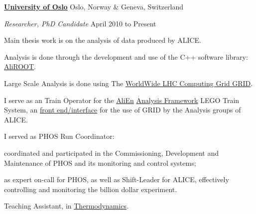 \documentclass[11pt]{article}
\newenvironment{outerlist}[1][\enskip\textbullet]%
        {\begin{itemize}[#1]}{\end{itemize}%
         \vspace{-.6\baselineskip}}
\newenvironment{innerlist}[1][\enskip\textbullet]%
        {\begin{compactitem}[#1]}{\end{compactitem}}
\newcommand{\blankline}{\quad\pagebreak[2]}
\begin{document}
\href{http://www.uib.no/en}{\textbf{University of Oslo}}
Oslo, Norway \& Geneva, Switzerland
\begin{outerlist}
\item[] \textit{Researcher, PhD Candidate}
  \hfill April 2010 to Present
  \begin{innerlist}
  \item Main thesis work is on the analysis of data produced by ALICE.
    \begin{innerlist}
    \item Analysis is done through the development and use of the 
      C++ software library: 
      \href{http://aliweb.cern.ch/Offline/AliRoot/Manual.html}{AliROOT}.
    \item Large Scale Analysis is done using The 
      \href{http://wlcg.web.cern.ch/}{WorldWide LHC Computing Grid GRID}.
    \item I serve as an Train Operator for the \href{alien2.cern.ch}{AliEn} 
      \href{http://aliweb.cern.ch/Offline/Activities/Analysis/AnalysisFramework/index.html}{Analysis Framework} LEGO Train System, an 
      \href{http://alimonitor.cern.ch/map.jsp}{front end/interface} 
      for the use of GRID by the Analysis groups of ALICE.
    \end{innerlist}
  \item I served as PHOS Run Coordinator:
    \begin{innerlist}
    \item coordinated and participated in the Commissioning, 
      Development and Maintenance of PHOS and its monitoring and control systems;
    \item as expert on-call for PHOS, as well as Shift-Leader for ALICE, 
      effectively controlling and monitoring the billion dollar experiment.
    \end{innerlist}
  \item Teaching Assistant, in \href{http://www.uio.no/studier/emner/matnat/fys/FYS2160/index-eng.html}{Thermodynamics}.
  \end{innerlist}
\end{outerlist}

\blankline
\end{document}
